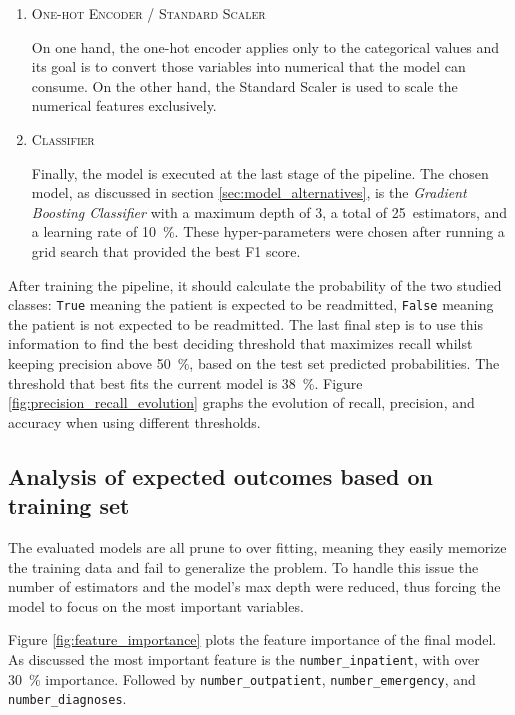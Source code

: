 \documentclass[a4paper,11pt]{article}
\newcommand{\numberOutpatient}{\texttt{number\_outpatient}\xspace}
\newcommand{\numberEmergency}{\texttt{number\_emergency}\xspace}
\newcommand{\numberInpatient}{\texttt{number\_inpatient}\xspace}
\newcommand{\numberDiagnoses}{\texttt{number\_diagnoses}\xspace}
\begin{document}
\begin{enumerate}
    \item \textsc{One-hot Encoder / Standard Scaler}
    
    On one hand, the one-hot encoder applies only to the categorical values and its goal is to convert those variables into numerical that the model can consume. On the other hand, the Standard Scaler is used to scale the numerical features exclusively.
    
    
    \item \textsc{Classifier}
    
    Finally, the model is executed at the last stage of the pipeline. The chosen model, as discussed in section \ref{sec:model_alternatives}, is the \textit{Gradient Boosting Classifier} with a maximum depth of $3$, a total of \SI{25}{estimators}, and a learning rate of \SI{10}{\percent}. 
    These hyper-parameters were chosen after running a grid search that provided the best F1 score.
    
\end{enumerate}

After training the pipeline, it should calculate the probability of the two studied classes: \texttt{True} meaning the patient is expected to be readmitted, \texttt{False} meaning the patient is not expected to be readmitted. The last final step is to use this information to find the best deciding threshold that maximizes recall whilst keeping precision above \SI{50}{\percent}, based on the test set predicted probabilities. The threshold that best fits the current model is \SI{38}{\percent}. Figure \ref{fig:precision_recall_evolution} graphs the evolution of recall, precision, and accuracy when using different thresholds.

\subsection{Analysis of expected outcomes based on training set}
\label{sec:expected_outcomes}

The evaluated models are all prune to over fitting, meaning they easily memorize the training data and fail to generalize the problem. %
To handle this issue the number of estimators and the model's max depth were reduced, thus forcing the model to focus on the most important variables. 

Figure \ref{fig:feature_importance} plots the feature importance of the final model. As discussed the most important feature is the \numberInpatient, with over \SI{30}{\percent} importance. Followed by \numberOutpatient, \numberEmergency, and \numberDiagnoses.
\end{document}
